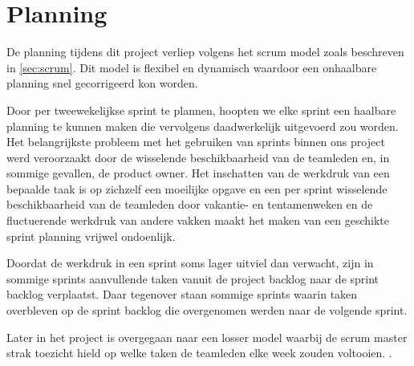 \section{Planning}
De planning tijdens dit project verliep volgens het scrum model zoals beschreven in \autoref{sec:scrum}. Dit model is flexibel en dynamisch waardoor een onhaalbare planning snel gecorrigeerd kon worden. 

Door per tweewekelijkse sprint te plannen, hoopten we elke sprint een haalbare planning te kunnen maken die vervolgens daadwerkelijk uitgevoerd zou worden. Het belangrijkste probleem met het gebruiken van sprints binnen ons project werd veroorzaakt door de wisselende beschikbaarheid van de teamleden en, in sommige gevallen, de product owner. Het inschatten van de werkdruk van een bepaalde taak is op zichzelf een moeilijke opgave en een per sprint wisselende beschikbaarheid van de teamleden door vakantie- en tentamenweken en de fluctuerende werkdruk van andere vakken maakt het maken van een geschikte sprint planning vrijwel ondoenlijk.

Doordat de werkdruk in een sprint soms lager uitviel dan verwacht, zijn in sommige sprints aanvullende taken vanuit de project backlog naar de sprint backlog verplaatst. Daar tegenover staan sommige sprints waarin taken overbleven op de sprint backlog die overgenomen werden naar de volgende sprint.

Later in het project is overgegaan naar een losser model waarbij de scrum master strak toezicht hield op welke taken de teamleden elke week zouden voltooien. .